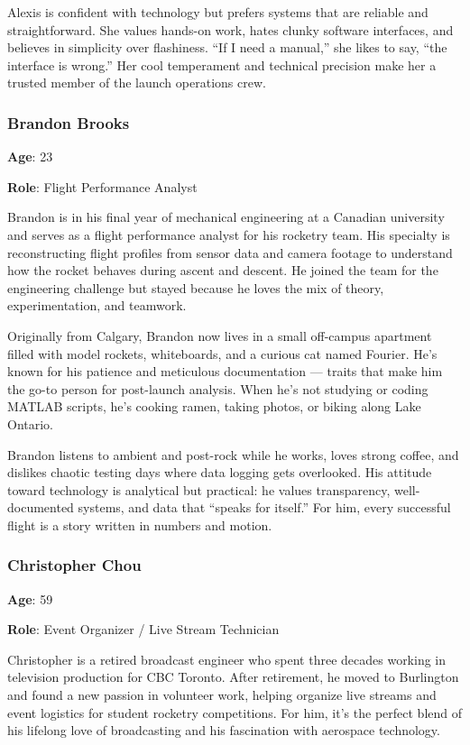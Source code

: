 \documentclass[12pt]{article}
\begin{document}
Alexis is confident with technology but prefers systems that are reliable and
straightforward. She values hands-on work, hates clunky software interfaces,
and believes in simplicity over flashiness. “If I need a manual,” she likes to
say, “the interface is wrong.” Her cool temperament and technical precision
make her a trusted member of the launch operations crew.

\subsubsection*{Brandon Brooks}

\textbf{Age}: 23

\textbf{Role}: Flight Performance Analyst

Brandon is in his final year of mechanical engineering at a Canadian university
and serves as a flight performance analyst for his rocketry team. His specialty
is reconstructing flight profiles from sensor data and camera footage to
understand how the rocket behaves during ascent and descent. He joined the team
for the engineering challenge but stayed because he loves the mix of theory,
experimentation, and teamwork.

Originally from Calgary, Brandon now lives in a small off-campus apartment
filled with model rockets, whiteboards, and a curious cat named Fourier. He's
known for his patience and meticulous documentation — traits that make him the
go-to person for post-launch analysis. When he's not studying or coding MATLAB
scripts, he's cooking ramen, taking photos, or biking along Lake Ontario.

Brandon listens to ambient and post-rock while he works, loves strong coffee,
and dislikes chaotic testing days where data logging gets overlooked. His
attitude toward technology is analytical but practical: he values transparency,
well-documented systems, and data that “speaks for itself.” For him, every
successful flight is a story written in numbers and motion.

\subsubsection*{Christopher Chou}

\textbf{Age}: 59

\textbf{Role}: Event Organizer / Live Stream Technician

Christopher is a retired broadcast engineer who spent three decades working in
television production for CBC Toronto. After retirement, he moved to Burlington
and found a new passion in volunteer work, helping organize live streams and
event logistics for student rocketry competitions. For him, it's the perfect
blend of his lifelong love of broadcasting and his fascination with aerospace
technology.
\end{document}
